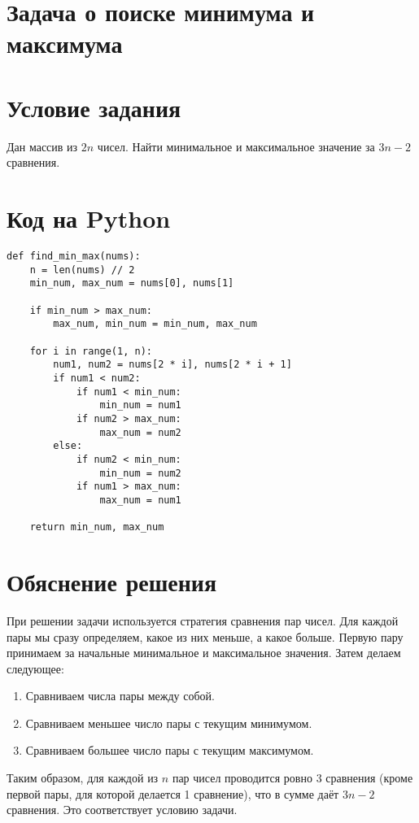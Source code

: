 \section*{Задача о поиске минимума и максимума}
\date{}


\section*{Условие задания}

Дан массив из $2n$ чисел. Найти минимальное и максимальное значение за $3n - 2$ сравнения.

\section*{Код на Python}

\begin{verbatim}
def find_min_max(nums):
    n = len(nums) // 2
    min_num, max_num = nums[0], nums[1]

    if min_num > max_num:
        max_num, min_num = min_num, max_num

    for i in range(1, n):
        num1, num2 = nums[2 * i], nums[2 * i + 1]
        if num1 < num2:
            if num1 < min_num:
                min_num = num1
            if num2 > max_num:
                max_num = num2
        else:
            if num2 < min_num:
                min_num = num2
            if num1 > max_num:
                max_num = num1

    return min_num, max_num
\end{verbatim}

\section*{Обяснение решения}

При решении задачи используется стратегия сравнения пар чисел. Для каждой пары мы сразу определяем, какое из них меньше, а какое больше. Первую пару принимаем за начальные минимальное и максимальное значения. Затем делаем следующее:

\begin{enumerate}
    \item Сравниваем числа пары между собой.
    \item Сравниваем меньшее число пары с текущим минимумом.
    \item Сравниваем большее число пары с текущим максимумом.
\end{enumerate}

Таким образом, для каждой из $n$ пар чисел проводится ровно 3 сравнения (кроме первой пары, для которой делается 1 сравнение), что в сумме даёт $3n - 2$ сравнения. Это соответствует условию задачи.
